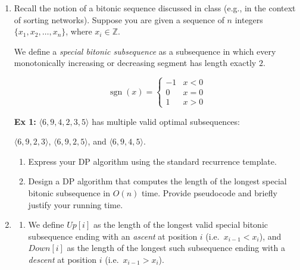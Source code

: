 \documentclass[12pt,a4paper]{article}
\makeatletter
\newtheorem*{solution}{Solution}
\theoremstyle{definition}
\renewenvironment{solution}[1][Solution] {\par\pushQED{\qed}\normalfont\topsep6\p@\@plus6\p@\relax\trivlist\item[\hskip\labelsep\bfseries#1\@addpunct{.}]\ignorespaces}{\popQED\endtrivlist\@endpefalse} \makeatother
\makeatother
\begin{document}
\begin{enumerate}
    \item {\color{purple}{(Longest Special Bitonic Subsequence)}}
    
    Recall the notion of a bitonic sequence discussed in class (e.g., in the context of sorting networks). Suppose you are given a sequence of $n$ integers $\{x_1, x_2, \dots, x_n\}$, where $x_i \in \mathbb{Z}$.
    
    We define a \textit{special bitonic subsequence} as a subsequence in which every monotonically increasing or decreasing segment has length exactly $2$.
    
    \begin{minipage}{0.4\textwidth}
        \[
            \operatorname{sgn}(x) =
            \begin{cases}
            -1 & x < 0 \\
            0 & x = 0 \\
            1 & x > 0
            \end{cases}
        \]
    \end{minipage}
    \hfill
    \begin{minipage}{0.55\textwidth}
        \textbf{Ex 1:} $\langle 6, 9, 4, 2, 3, 5 \rangle$ has multiple valid optimal subsequences:
        
        $\langle 6, 9, 2, 3 \rangle$, $\langle 6, 9, 2, 5 \rangle$, and $\langle 6, 9, 4, 5 \rangle$.
    \end{minipage}

    \begin{enumerate}
        \item Express your DP algorithm using the standard recurrence template. 
        
        \item Design a DP algorithm that computes the length of the longest special bitonic subsequence in $O(n)$ time. Provide pseudocode and briefly justify your running time.

        {}
    \end{enumerate}
    \begin{solution}
        \begin{enumerate}
        \item
        We define $Up[i]$ as the length of the longest valid special
        bitonic subsequence ending with an \emph{ascent} at position
        $i$ (i.e.\ $x_{i-1} < x_i$), and $Down[i]$ as the length of
        the longest such subsequence ending with a \emph{descent} at
        position $i$ (i.e.\ $x_{i-1} > x_i$).


\end{enumerate}
\end{solution}
\end{enumerate}
\end{document}
